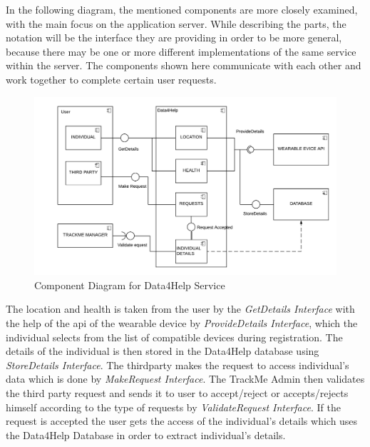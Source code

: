In the following diagram, the mentioned components are more closely examined, with the main focus on the application server. While describing the parts, the notation will be the interface they are providing in order to be more general, because there may be one or more different implementations of the same service within the server. The components shown here communicate with each other and work together to complete certain user requests.
\begin{figure}[H]
	\begin{center}
		\includegraphics[width=\textwidth]{./DD_Diagrams/ComponentData4Help.png}
      	\caption{Component Diagram for Data4Help Service}
        \label{TrackMe_c1}
	\end{center}
\end{figure}
The location and health is taken from the user by the \textit{GetDetails Interface} with the help of the api of the wearable device by \textit{ProvideDetails Interface}, which the individual selects from the list of compatible devices during registration. The details of the individual is then stored in the Data4Help database using \textit{StoreDetails Interface}.\newline
The thirdparty makes the request to access individual's data which is done by \textit{MakeRequest Interface}.\newline
The TrackMe Admin then validates the third party request and sends it to user to accept/reject or accepts/rejects himself according to the type of requests by \textit{ValidateRequest Interface}.\newline
If the request is accepted the user gets the access of the individual's details which uses the Data4Help Database in order to extract individual's details.
